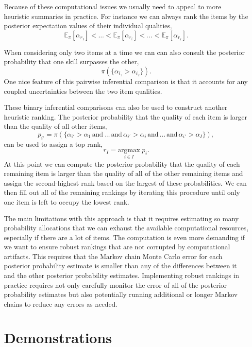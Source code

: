 \documentclass[
  letterpaper,
  DIV=11,
  numbers=noendperiod]{scrartcl}
\begin{document}
Because of these computational issues we usually need to appeal to more
heuristic summaries in practice. For instance we can always rank the
items by the posterior expectation values of their individual qualities,
\[
\mathbb{E}_{\pi}[ \alpha_{r_{1}} ] < \ldots <
\mathbb{E}_{\pi}[ \alpha_{r_{i}} ] < \ldots <
\mathbb{E}_{\pi}[ \alpha_{r_{I}} ].
\]

When considering only two items at a time we can can also consult the
posterior probability that one skill surpasses the other, \[
\pi( \{ \alpha_{i_{1}} > \alpha_{i_{2}} \} ).
\] One nice feature of this pairwise inferential comparison is that it
accounts for any coupled uncertainties between the two item qualities.

These binary inferential comparisons can also be used to construct
another heuristic ranking. The posterior probability that the quality of
each item is larger than the quality of all other items, \[
p_{i'} = \pi( \{ \alpha_{i'} > \alpha_{1} \,
                 \text{and} \, \ldots \, \text{and} \,
                 \alpha_{i'} > \alpha_{i} \,
                 \text{and} \, \ldots \, \text{and} \,
                 \alpha_{i'} > \alpha_{I} \}),
\] can be used to assign a top rank, \[
r_{I} = \underset{i \in I}{\mathrm{argmax}} \; p_{i}.
\] At this point we can compute the posterior probability that the
quality of each remaining item is larger than the quality of all of the
other remaining items and assign the second-highest rank based on the
largest of these probabilities. We can then fill out all of the
remaining rankings by iterating this procedure until only one item is
left to occupy the lowest rank.

The main limitations with this approach is that it requires estimating
so many probability allocations that we can exhaust the available
computational resources, especially if there are a lot of items. The
computation is even more demanding if we want to ensure robust rankings
that are not corrupted by computational artifacts. This requires that
the Markov chain Monte Carlo error for each posterior probability
estimate is smaller than any of the differences between it and the other
posterior probability estimates. Implementing robust rankings in
practice requires not only carefully monitor the error of all of the
posterior probability estimates but also potentially running additional
or longer Markov chains to reduce any errors as needed.

\section{Demonstrations}\label{demonstrations}
\end{document}
